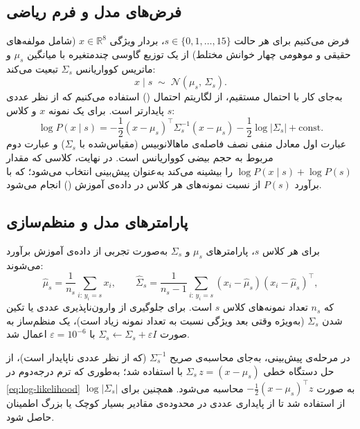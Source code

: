 \subsection{فرض‌های مدل و فرم ریاضی}
فرض می‌کنیم برای هر حالت $s \in \{0,1,\ldots,15\}$، بردار ویژگی $x \in \mathbb{R}^8$ (شامل مولفه‌های حقیقی و موهومی چهار خوانش مختلط) از یک توزیع گاوسی چندمتغیره با میانگین $\mu_s$ و ماتریس کوواریانس $\Sigma_s$ تبعیت می‌کند:
\begin{equation}
	x \mid s \;\sim\; \mathcal{N}(\mu_s,\, \Sigma_s).
	\label{eq:gaussian-class}
\end{equation}
به‌جای کار با احتمال مستقیم، از لگاریتم احتمال () استفاده می‌کنیم که از نظر عددی پایدارتر است. برای یک نمونه $x$ و کلاس $s$:
\begin{equation}
	\log P(x \mid s) = -\frac{1}{2}(x - \mu_s)^\top \Sigma_s^{-1} (x - \mu_s) - \frac{1}{2} \log |\Sigma_s| + \mathrm{const}.
	\label{eq:log-likelihood}
\end{equation}
عبارت اول معادل منفی نصف فاصله‌ی ماهالانوبیس (مقیاس‌شده با $\Sigma_s$) و عبارت دوم مربوط به حجم بیضی کوواریانس است. در نهایت، کلاسی که مقدار $\log P(x \mid s) + \log P(s)$ را بیشینه می‌کند به‌عنوان پیش‌بینی انتخاب می‌شود؛ که با برآورد $P(s)$ از نسبت نمونه‌های هر کلاس در داده‌ی آموزش () انجام می‌شود.

\subsection{پارامترهای مدل و منظم‌سازی}
برای هر کلاس $s$، پارامترهای $\mu_s$ و $\Sigma_s$ به‌صورت تجربی از داده‌ی آموزش برآورد می‌شوند:
\begin{equation}
	\hat{\mu}_s = \frac{1}{n_s} \sum_{i:\, y_i = s} x_i, \qquad \hat{\Sigma}_s = \frac{1}{n_s-1} \sum_{i:\, y_i = s} (x_i - \hat{\mu}_s)(x_i - \hat{\mu}_s)^\top,
	\label{eq:mean-cov}
\end{equation}
که $n_s$ تعداد نمونه‌های کلاس $s$ است. برای جلوگیری از وارون‌ناپذیری عددی یا تکین شدن $\Sigma_s$ (به‌ویژه وقتی بعد ویژگی نسبت به تعداد نمونه زیاد است)، یک منظم‌ساز به صورت $\Sigma_s \leftarrow \Sigma_s + \varepsilon I$ با $\varepsilon = 10^{-6}$ اعمال شد.

در مرحله‌ی پیش‌بینی، به‌جای محاسبه‌ی صریح $\Sigma_s^{-1}$ (که از نظر عددی ناپایدار است)، از حل دستگاه خطی $\Sigma_s \, z = (x - \mu_s)$ با  استفاده شد؛ به‌طوری که ترم درجه‌دوم در \eqref{eq:log-likelihood} به صورت $-\frac{1}{2}(x - \mu_s)^\top z$ محاسبه می‌شود. همچنین برای $\log |\Sigma_s|$ از  استفاده شد تا از پایداری عددی در محدوده‌ی مقادیر بسیار کوچک یا بزرگ اطمینان حاصل شود.

